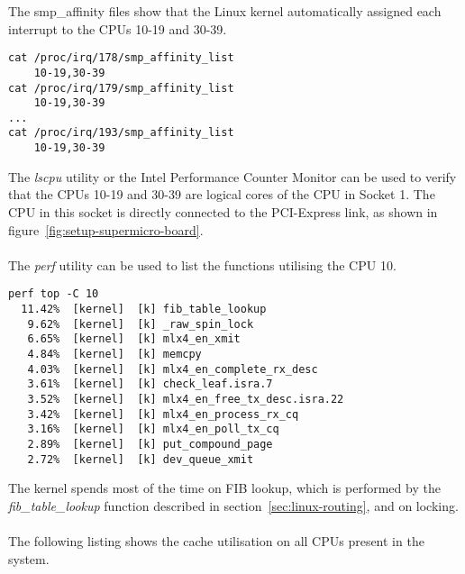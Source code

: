 The smp\_affinity files show that the Linux kernel
automatically assigned each interrupt to the CPUs 10-19 and 30-39.
\begin{lstlisting}
cat /proc/irq/178/smp_affinity_list
	10-19,30-39
cat /proc/irq/179/smp_affinity_list
	10-19,30-39
...
cat /proc/irq/193/smp_affinity_list
	10-19,30-39
\end{lstlisting}
The {\it{lscpu}} utility or the Intel Performance Counter Monitor can be used to
verify that the CPUs 10-19 and 30-39 are logical cores of the CPU in Socket 1.
The CPU in this socket is directly connected to the PCI-Express link, as shown in figure~\ref{fig:setup-supermicro-board}.
\\
\\
The {\it{perf}} utility can be used to list the functions utilising the CPU 10.
\begin{lstlisting}
perf top -C 10
  11.42%  [kernel]  [k] fib_table_lookup
   9.62%  [kernel]  [k] _raw_spin_lock
   6.65%  [kernel]  [k] mlx4_en_xmit
   4.84%  [kernel]  [k] memcpy
   4.03%  [kernel]  [k] mlx4_en_complete_rx_desc
   3.61%  [kernel]  [k] check_leaf.isra.7
   3.52%  [kernel]  [k] mlx4_en_free_tx_desc.isra.22
   3.42%  [kernel]  [k] mlx4_en_process_rx_cq
   3.16%  [kernel]  [k] mlx4_en_poll_tx_cq
   2.89%  [kernel]  [k] put_compound_page
   2.72%  [kernel]  [k] dev_queue_xmit
\end{lstlisting}
The kernel spends most of the time on FIB lookup, which is performed by the {\it{fib\_table\_lookup}} function described
in section~\ref{sec:linux-routing}, and on locking.
\\
\\
The following listing shows the cache utilisation on all CPUs present in the system.
